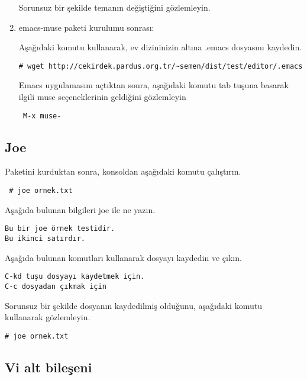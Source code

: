 \documentclass[a4paper,10pt]{article}
\begin{document}
\begin{enumerate}
Sorunsuz bir şekilde temanın değiştiğini gözlemleyin.

\item emacs-muse paketi kurulumu sonrası:

Aşağıdaki komutu kullanarak, ev dizininizin altına .emacs dosyasını kaydedin.
\begin{verbatim}
# wget http://cekirdek.pardus.org.tr/~semen/dist/test/editor/.emacs 
\end{verbatim}

Emacs uygulamasını açtıktan sonra, aşağıdaki komutu tab tuşuna basarak ilgili muse seçeneklerinin geldiğini gözlemleyin
\begin{verbatim}
 M-x muse-
\end{verbatim}


\end{enumerate}


\subsection*{Joe}

Paketini kurduktan sonra, konsoldan aşağıdaki komutu çalıştırın.

\begin{verbatim}
 # joe ornek.txt
\end{verbatim}

Aşağıda bulunan bilgileri joe ile ne yazın.
\begin{verbatim}
Bu bir joe örnek testidir.
Bu ikinci satırdır.
\end{verbatim}

Aşağıda bulunan komutları kullanarak dosyayı kaydedin ve çıkın.
\begin{verbatim}
C-kd tuşu dosyayı kaydetmek için.
C-c dosyadan çıkmak için
\end{verbatim}


Sorunsuz bir şekilde dosyanın kaydedilmiş olduğunu, aşağıdaki komutu kullanarak gözlemleyin.
\begin{verbatim}
# joe ornek.txt 
\end{verbatim}

\subsection*{Vi alt bileşeni}
\end{document}
